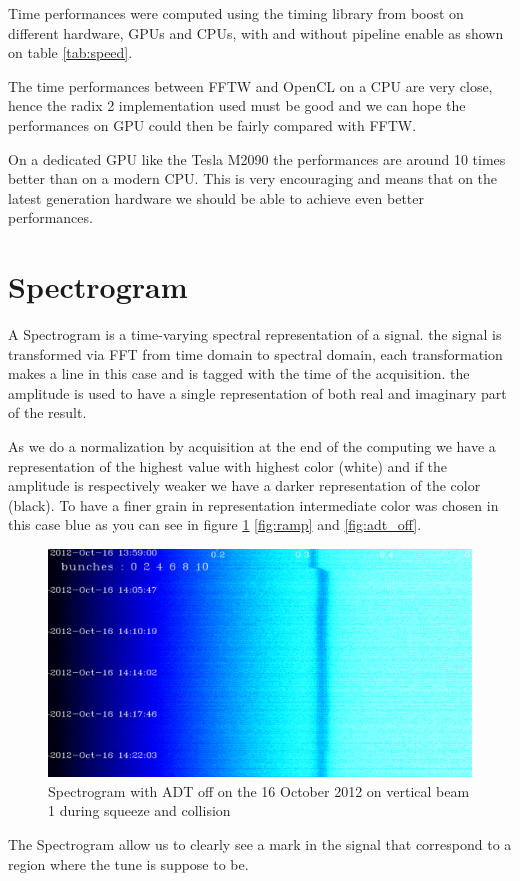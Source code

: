 	Time performances were computed using the timing library from boost \cite{boost} on different hardware, \glspl{GPU} and \glspl{CPU}, with and without pipeline enable as shown on table \ref{tab:speed}.

	The time performances between \gls{FFTW} and \gls{OpenCL} on a \gls{CPU} are very close, hence the radix 2 implementation used must be good and we can hope the performances on \gls{GPU} could then be fairly compared with \gls{FFTW}.

	On a dedicated \gls{GPU} like the Tesla M2090  the performances are around 10 times better than on a modern \gls{CPU}. This is very encouraging and means that on the latest generation hardware we should be able to achieve even better performances.
	
\section{Spectrogram}
\label{sec:spectrogram}

A Spectrogram is a time-varying spectral representation of a signal. the signal is transformed via \gls{FFT} from time domain to spectral domain, each transformation makes a line in this case and is tagged with the time of the acquisition. the amplitude is used to have a single representation of both real and imaginary part of the result.

As we do a normalization by acquisition at the end of the computing we have a representation of the highest value with highest color (white) and if the amplitude is respectively weaker we have a darker representation of the color (black). To have a finer grain in representation intermediate color was chosen in this case blue as you can see in figure \ref{fig:squeeze} \ref{fig:ramp} and \ref{fig:adt_off}.

\begin{figure}[H]
	\caption{Spectrogram with ADT off on the 16 October 2012 on vertical beam 1 during squeeze and collision}
	\label{fig:squeeze}
	\centering
	\includegraphics[scale=0.3]{md-121016-vb1-m1-6bunches-10acc-1359-1425-collision.pdf}
\end{figure}

The Spectrogram allow us to clearly see a mark in the signal that correspond to a region where the tune is suppose to be.